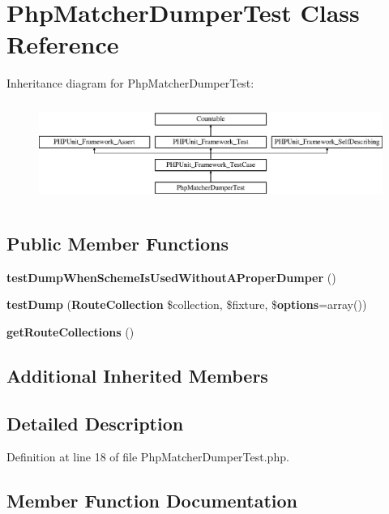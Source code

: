 \section{Php\+Matcher\+Dumper\+Test Class Reference}
\label{class_symfony_1_1_component_1_1_routing_1_1_tests_1_1_matcher_1_1_dumper_1_1_php_matcher_dumper_test}
Inheritance diagram for Php\+Matcher\+Dumper\+Test\+:\begin{figure}[H]
\begin{center}
\leavevmode
\includegraphics[height=3.303835cm]{class_symfony_1_1_component_1_1_routing_1_1_tests_1_1_matcher_1_1_dumper_1_1_php_matcher_dumper_test}
\end{center}
\end{figure}
\subsection*{Public Member Functions}
\begin{DoxyCompactItemize}
\item 
{\bf test\+Dump\+When\+Scheme\+Is\+Used\+Without\+A\+Proper\+Dumper} ()
\item 
{\bf test\+Dump} ({\bf Route\+Collection} \$collection, \$fixture, \${\bf options}=array())
\item 
{\bf get\+Route\+Collections} ()
\end{DoxyCompactItemize}
\subsection*{Additional Inherited Members}


\subsection{Detailed Description}


Definition at line 18 of file Php\+Matcher\+Dumper\+Test.\+php.



\subsection{Member Function Documentation}
